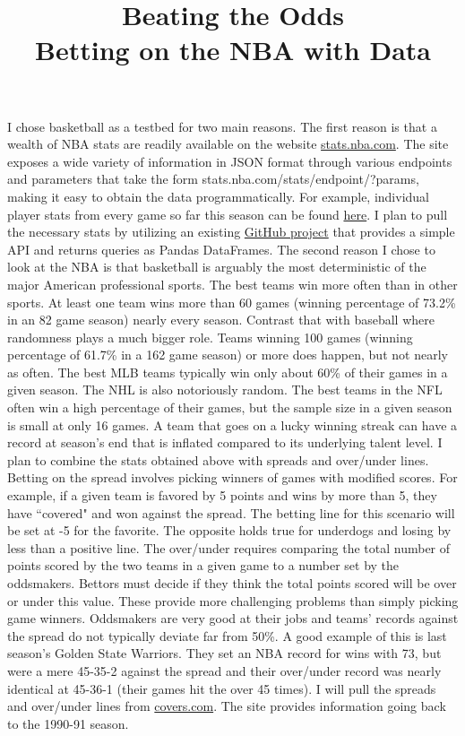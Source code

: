 \documentclass{article}
\title{Beating the Odds \\ Betting on the NBA with Data}
\date{\vspace{-5ex}}
\begin{document}
\maketitle
I chose basketball as a testbed for two main reasons. The first reason is that a wealth of NBA stats are readily available on the website \url{stats.nba.com}. The site exposes a wide variety of information in JSON format through various endpoints and parameters that take the form stats.nba.com/stats/{endpoint}/?{params}, making it easy to obtain the data programmatically. For example, individual player stats from every game so far this season can be found \href{http://stats.nba.com/stats/leaguegamelog/?LeagueID=00&Season=2016-17&SeasonType=Regular\%20Season&PlayerOrTeam=P&Sorter=PTS&Direction=DESC}{here}. I plan to pull the necessary  stats by utilizing an existing \href{https://github.com/seemethere/nba_py}{GitHub project} that provides a simple API and returns queries as Pandas DataFrames.
\bigbreak
The second reason I chose to look at the NBA is that basketball is arguably the most deterministic of the major American professional sports. The best teams win more often than in other sports. At least one team wins more than 60 games (winning percentage of 73.2\% in an 82 game season) nearly every season. Contrast that with baseball where randomness plays a much bigger role. Teams winning 100 games (winning percentage of 61.7\% in a 162 game season) or more does happen, but not nearly as often. The best MLB teams typically win only about 60\% of their games in a given season. The NHL is also notoriously random. The best teams in the NFL often win a high percentage of their games, but the sample size in a given season is small at only 16 games. A team that goes on a lucky winning streak can have a record at season's end that is inflated compared to its underlying talent level.
\bigbreak
I plan to combine the stats obtained above with spreads and over/under lines. Betting on the spread involves picking winners of games with modified scores. For example, if a given team is favored by 5 points and wins by more than 5, they have ``covered" and won against the spread. The betting line for this scenario will be set at -5 for the favorite. The opposite holds true for underdogs and losing by less than a positive line. The over/under requires comparing the total number of points scored by the two teams in a given game to a number set by the oddsmakers. Bettors must decide if they think the total points scored will be over or under this value. These provide more challenging problems than simply picking game winners. Oddsmakers are very good at their jobs and teams' records against the spread do not typically deviate far from 50\%. A good example of this is last season's Golden State Warriors. They set an NBA record for wins with 73, but were a mere 45-35-2 against the spread and their over/under record was nearly identical at 45-36-1 (their games hit the over 45 times). I will pull the spreads and over/under lines from \url{covers.com}. The site provides information going back to the 1990-91 season.
\end{document}
